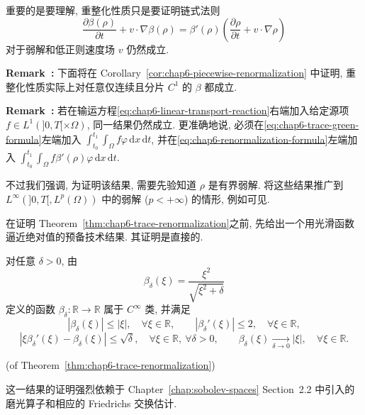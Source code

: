 \begin{sloppypar}
重要的是要理解, 重整化性质只是要证明链式法则
\[
 \frac{\partial\beta(\rho)}{\partial t}+v\cdot\nabla\beta(\rho)
 =\beta'(\rho)\left(\frac{\partial\rho}{\partial t}+v\cdot\nabla\rho\right)
\]
对于弱解和低正则速度场 $v$ 仍然成立.

\par\noindent{}\textbf{Remark~\thechaptersixsectiononeremark:}\label{rem:chap6-piecewise-renormalization}
下面将在 Corollary~\ref{cor:chap6-piecewise-renormalization} 中证明, 重整化性质实际上对任意仅连续且分片 $C^1$ 的 $\beta$ 都成立.

\par\noindent{}\textbf{Remark~\thechaptersixsectiononeremark:}\label{rem:chap6-transport-source-term}
若在输运方程\eqref{eq:chap6-linear-transport-reaction}右端加入给定源项 $f\in L^1(]0,T[\times\Omega)$, 同一结果仍然成立. 更准确地说, 必须在\eqref{eq:chap6-trace-green-formula}左端加入
$\int_{t_0}^{t_1}\int_\Omega f\varphi\,\mathrm dx\,\mathrm dt$, 并在\eqref{eq:chap6-renormalization-formula}左端加入
$\int_{t_0}^{t_1}\int_\Omega f\beta'(\rho)\varphi\,\mathrm dx\,\mathrm dt$.

不过我们强调, 为证明该结果, 需要先验知道 $\rho$ 是有界弱解. 将这些结果推广到 $L^\infty(]0,T[,L^p(\Omega))$ 中的弱解 ($p<+\infty$) 的情形, 例如可见.

在证明 Theorem~\ref{thm:chap6-trace-renormalization}之前, 先给出一个用光滑函数逼近绝对值的预备技术结果. 其证明是直接的.

\begin{Lemma}
\label{lem:chap6-smooth-absolute-value}
对任意 $\delta>0$, 由
\[
 \beta_\delta(\xi)=\frac{\xi^2}{\sqrt{\xi^2+\delta}}
\]
定义的函数 $\beta_\delta:\mathbb R\to\mathbb R$ 属于 $C^\infty$ 类, 并满足
\[
 |\beta_\delta(\xi)|\leq|\xi|,\quad\forall\xi\in\mathbb R,
 \qquad
 |\beta_\delta'(\xi)|\leq2,\quad\forall\xi\in\mathbb R,
\]
\[
 |\xi\beta_\delta'(\xi)-\beta_\delta(\xi)|\leq\sqrt\delta,
 \quad\forall\xi\in\mathbb R,\ \forall\delta>0,
 \qquad
 \beta_\delta(\xi)\xrightarrow[\delta\to0]{}|\xi|,
 \quad\forall\xi\in\mathbb R.
\]
\end{Lemma}

\begin{Proof}
\textup{(of Theorem~\ref{thm:chap6-trace-renormalization})}

这一结果的证明强烈依赖于 Chapter~\ref{chap:sobolev-spaces} Section~2.2 中引入的磨光算子和相应的 Friedrichs 交换估计.


\end{Proof}
\end{sloppypar}
